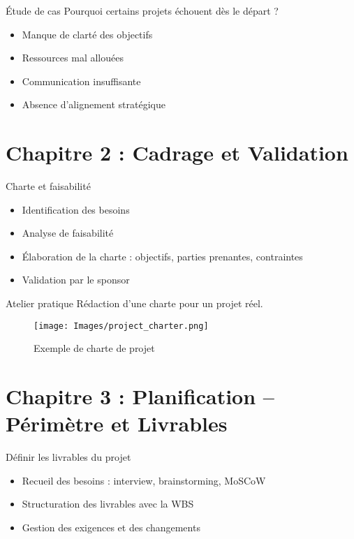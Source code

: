 \documentclass[11pt]{beamer}
\begin{document}
\begin{frame}{Étude de cas}
  \pause
  Pourquoi certains projets échouent dès le départ ? \pause
  \begin{itemize}
    \item Manque de clarté des objectifs \pause
    \item Ressources mal allouées \pause
    \item Communication insuffisante \pause
    \item Absence d'alignement stratégique
  \end{itemize}
\end{frame}

\section{Chapitre 2 : Cadrage et Validation}
\begin{frame}{Charte et faisabilité}
  \pause
  \begin{itemize}
    \item Identification des besoins \pause
    \item Analyse de faisabilité \pause
    \item Élaboration de la charte : objectifs, parties prenantes, contraintes \pause
    \item Validation par le sponsor
  \end{itemize}
\end{frame}

\begin{frame}{Atelier pratique}
  \pause
  Rédaction d’une charte pour un projet réel.\pause
  \begin{figure}\centering
    \texttt{[image: Images/project\_charter.png]}
    \caption{Exemple de charte de projet}
  \end{figure}
\end{frame}

\section{Chapitre 3 : Planification – Périmètre et Livrables}
\begin{frame}{Définir les livrables du projet}
  \pause
  \begin{itemize}
    \item Recueil des besoins : interview, brainstorming, MoSCoW \pause
    \item Structuration des livrables avec la WBS \pause
    \item Gestion des exigences et des changements
  \end{itemize}
\end{frame}
\end{document}
